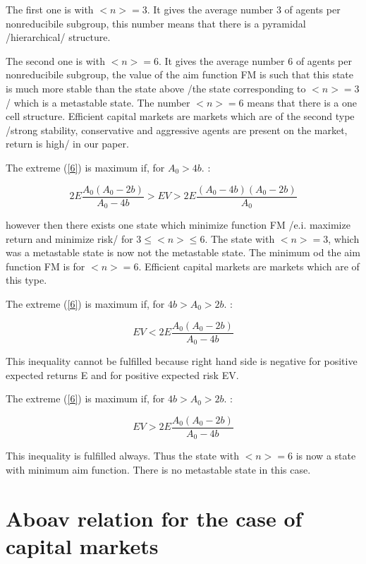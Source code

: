 \documentclass[10pt]{article}
\begin{document}
The first one is with $<n> = 3$.
It gives the average number 3 of agents per nonreducibile subgroup, this number means that there is a pyramidal /hierarchical/ structure.

The second one is with $<n>=6$.
It gives the average number 6 of agents per nonreducibile subgroup, the value of the aim function FM is such that this state is much more stable than the state above /the state corresponding to $<n> = 3$/ which is a metastable state. The number $<n> = 6$ means that there is a one cell structure. Efficient capital markets are markets which are of the second type /strong stability, conservative and aggressive agents are
present on the market, return is high/ in our paper.

The extreme (\ref{6}) is maximum if, for $A_{0} > 4b$. :

\begin{equation}
\label{8.1}
2E \frac{A_{0}(A_{0}-2b)}{A_{0}-4b} > EV > 2E \frac{(A_{0}-4b)(A_{0}-2b)}{A_{0}}
\end{equation}

however then there exists one state which minimize function FM /e.i. maximize return and minimize risk/ for $3 \leq <n> \leq 6$. The state with $<n> = 3$, which was a metastable state is now not the metastable state. The minimum od the aim function FM is for $<n>=6$.
Efficient capital markets are markets which are of this type.


The extreme (\ref{6}) is maximum if, for $4b > A_{0} > 2b$. :

\begin{equation}
\label{8.2}
EV < 2E \frac{A_{0}(A_{0}-2b)}{A_{0}-4b}
\end{equation}

This inequality cannot be fulfilled because right hand side is negative for positive expected returns E and for positive expected risk EV.


The extreme (\ref{6}) is maximum if, for $4b > A_{0} > 2b$. :

\begin{equation}
\label{8.3}
EV > 2E \frac{A_{0}(A_{0}-2b)}{A_{0}-4b}
\end{equation}

This inequality is fulfilled always. Thus the state with $<n>=6$ is now a state with minimum aim function. There is no metastable state in this case.


\section{Aboav relation for the case of capital markets}
\end{document}
